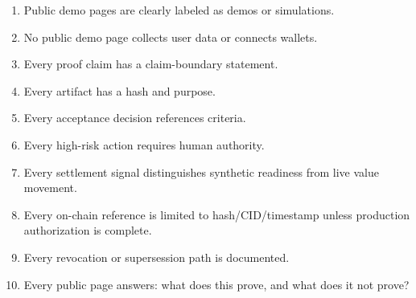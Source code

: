 \documentclass[11pt]{article}
\begin{document}
\begin{enumerate}
  \item Public demo pages are clearly labeled as demos or simulations.
  \item No public demo page collects user data or connects wallets.
  \item Every proof claim has a claim-boundary statement.
  \item Every artifact has a hash and purpose.
  \item Every acceptance decision references criteria.
  \item Every high-risk action requires human authority.
  \item Every settlement signal distinguishes synthetic readiness from live value movement.
  \item Every on-chain reference is limited to hash/CID/timestamp unless production authorization is complete.
  \item Every revocation or supersession path is documented.
  \item Every public page answers: what does this prove, and what does it not prove?
\end{enumerate}

\newpage
\printbibliography
\end{document}
